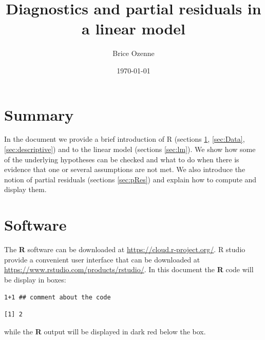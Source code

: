 \documentclass[12pt]{article}
\author{Brice Ozenne}
\date{\today}
\title{Diagnostics and partial residuals in a linear model}
\newcommand\Rlogo{\textbf{\textsf{R}}\xspace} %
\begin{document}
\maketitle

\section*{Summary}
\label{sec:org15aad81}
In the document we provide a brief introduction of R (sections
\ref{sec:Rsoftware}, \ref{sec:Data}, \ref{sec:descriptive}) and to the linear model
(sections \ref{sec:lm}). We show how some of the underlying hypotheses can
be checked and what to do when there is evidence that one or several
assumptions are not met. We also introduce the notion of partial
residuals (sections \ref{sec:pRes}) and explain how to compute and display
them.

\clearpage

\section{Software}
\label{sec:Rsoftware}
The \Rlogo{} software can be downloaded at
\url{https://cloud.r-project.org/}. R studio provide a convenient user
interface that can be downloaded at
\url{https://www.rstudio.com/products/rstudio/}.  In this document the
\Rlogo{} code will be display in boxes:
\lstset{language=r,label= ,caption= ,captionpos=b,numbers=none}
\begin{lstlisting}
1+1 ## comment about the code
\end{lstlisting}

\begin{verbatim}
[1] 2
\end{verbatim}

while the \Rlogo{} output will be displayed in dark red below the box. 

\bigskip
\end{document}

